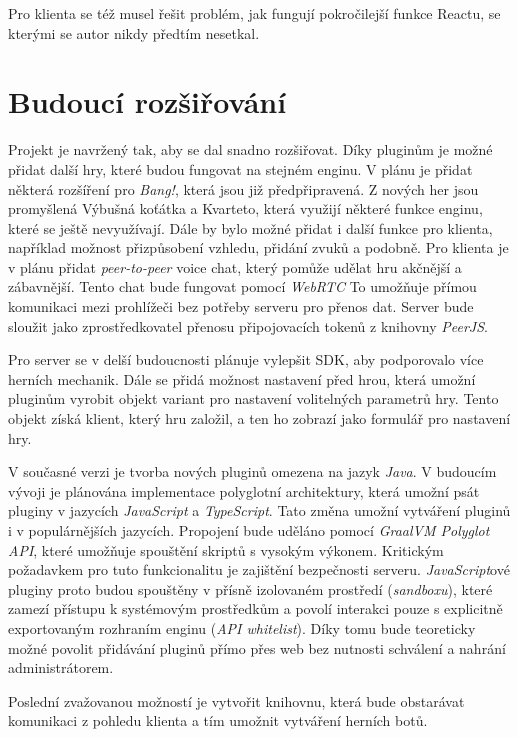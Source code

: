 Pro klienta se též musel řešit problém, jak fungují pokročilejší funkce Reactu, se kterými se autor nikdy předtím nesetkal.



\section{Budoucí rozšiřování}
Projekt je navržený tak, aby se dal snadno rozšiřovat. Díky pluginům je možné přidat další hry, které budou fungovat na stejném enginu. V plánu je přidat některá rozšíření pro \emph{Bang!}, která jsou již předpřipravená. Z nových her jsou promyšlená Výbušná koťátka a Kvarteto, která využijí některé funkce enginu, které se ještě nevyužívají. Dále by bylo možné přidat i další funkce pro klienta, například možnost přizpůsobení vzhledu, přidání zvuků a podobně. Pro klienta je v plánu přidat \emph{peer-to-peer} voice chat, který pomůže udělat hru akčnější a zábavnější. Tento chat bude fungovat pomocí \emph{WebRTC} To umožňuje přímou komunikaci mezi prohlížeči bez potřeby serveru pro přenos dat. Server bude sloužit jako zprostředkovatel přenosu připojovacích tokenů z knihovny \emph{PeerJS}.

Pro server se v delší budoucnosti plánuje vylepšit SDK, aby podporovalo více herních mechanik. Dále se přidá možnost nastavení před hrou, která umožní pluginům vyrobit objekt variant pro nastavení volitelných parametrů hry. Tento objekt získá klient, který hru založil, a ten ho zobrazí jako formulář pro nastavení hry.

V současné verzi je tvorba nových pluginů omezena na jazyk \emph{Java}. V budoucím vývoji je plánována implementace polyglotní architektury, která umožní psát pluginy v jazycích \emph{JavaScript} a \emph{TypeScript}. Tato změna umožní vytváření pluginů i v populárnějších jazycích. Propojení bude uděláno pomocí \emph{GraalVM Polyglot API}, které umožňuje spouštění skriptů s vysokým výkonem. Kritickým požadavkem pro tuto funkcionalitu je zajištění bezpečnosti serveru. \emph{JavaScript}ové pluginy proto budou spouštěny v přísně izolovaném prostředí (\emph{sandboxu}), které zamezí přístupu k systémovým prostředkům a povolí interakci pouze s explicitně exportovaným rozhraním enginu (\emph{API whitelist}). Díky tomu bude teoreticky možné povolit přidávání pluginů přímo přes web bez nutnosti schválení a nahrání administrátorem.

Poslední zvažovanou možností je vytvořit knihovnu, která bude obstarávat komunikaci z pohledu klienta a tím umožnit vytváření herních botů.

